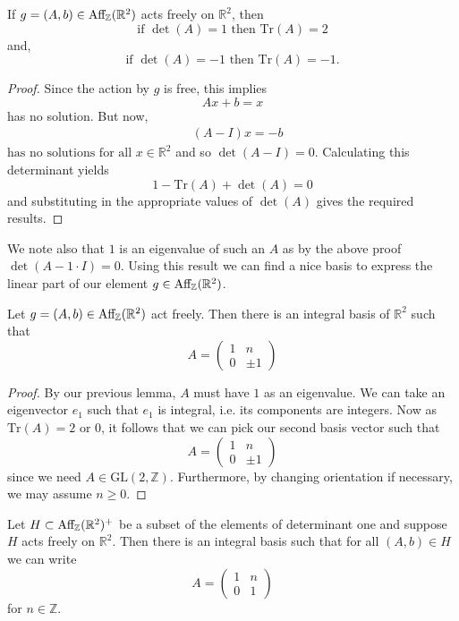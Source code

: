 \begin{lemma}
    If $g=(A,b) \in \text{Aff}_{\mathbb{Z}}(\mathbb{R}^2)$ acts freely on $\mathbb{R}^2$, then
    $$\text{if } \det(A) =1 \text{ then } \text{Tr}(A) = 2$$ and,
    $$\text{if } \det(A) =-1 \text{ then } \text{Tr}(A) = -1.$$\label{lemma:traces-free-action}
\end{lemma}
\begin{proof}
    Since the action by $g$ is free, this implies
    $$Ax +b =x$$
    has no solution. But now,
    \begin{align*}
         & (A-I)x = -b
    \end{align*}
    $\text{has no solutions for all } x\in \mathbb{R}^2$ and so $\det(A-I) = 0$. Calculating this determinant yields
    $$1- \text{Tr}(A) + \det(A) = 0$$
    and substituting in the appropriate values of $\det(A)$ gives the required results.

\end{proof}

We note also that $1$ is an eigenvalue of such an $A$ as by the above proof
$\det(A - 1\cdot I) = 0$. Using this result we can find a nice basis to express
the linear part of our element $g \in \text{Aff}_{\mathbb{Z}}(\mathbb{R}^2)$.

\begin{lemma}
    Let $g= (A,b) \in \text{Aff}_{\mathbb{Z}}(\mathbb{R}^2)$ act freely. Then there is an integral basis of $\mathbb{R}^2$ such that
    $$A = \begin{pmatrix}
            1 & n     \\
            0 & \pm 1
        \end{pmatrix}$$ \label{lemma:torus-matrixform}
\end{lemma}
\begin{proof}
    By our previous lemma, $A$ must have $1$ as an eigenvalue. We can take an eigenvector $e_1$ such that $e_1$ is integral, i.e. its components are integers.
    Now as $\text{Tr}(A) = 2 \text{ or } 0$, it follows that we can pick our second basis vector such that
    $$A = \begin{pmatrix}
            1 & n     \\
            0 & \pm 1
        \end{pmatrix}$$
    since we need $A \in \text{GL}(2, \mathbb{Z})$. Furthermore, by changing orientation if necessary, we may assume $n \geq 0$.
\end{proof}

\begin{lemma}
    \label{lemma:skew-matrix-form}

    Let $H \subset \text{Aff}_{\mathbb{Z}}(\mathbb{R}^2)^+$ be a subset of the elements of
    determinant one and suppose $H$ acts freely on $\mathbb{R}^2$. Then there is an
    integral basis such that for all $(A,b)\in H$ we can write $$A = \begin{pmatrix}
            1 & n \\
            0 & 1
        \end{pmatrix}$$
    for $n \in \mathbb{Z}.$
\end{lemma}

